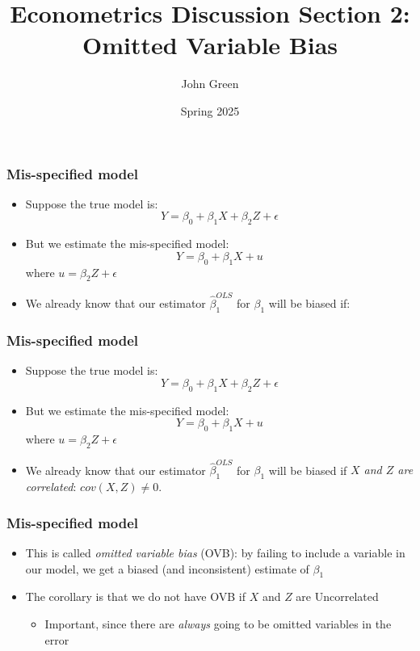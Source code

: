 \documentclass[aspectratio=169]{beamer}
\title{Econometrics Discussion Section 2: Omitted Variable Bias}
\author{John Green}
\date{Spring 2025}
\begin{document}
\begin{frame}
    \titlepage 
\end{frame}

\begin{frame}
    \frametitle{Mis-specified model}
    \begin{itemize}
        \item Suppose the true model is:
        $$
            Y = \beta_0 + \beta_1 X + \beta_2 Z + \epsilon
        $$
        \item But we estimate the mis-specified model:
        $$
            Y = \beta_0 + \beta_1 X + u
        $$
        where $u = \beta_2 Z + \epsilon$
        \item We already know that our estimator $\hat{\beta}_1^{OLS}$ for $\beta_1$ will be biased if:
    \end{itemize}
\end{frame}

\begin{frame}
    \frametitle{Mis-specified model}
    \begin{itemize}
        \item Suppose the true model is:
        $$
            Y = \beta_0 + \beta_1 X + \beta_2 Z + \epsilon
        $$
        \item But we estimate the mis-specified model:
        $$
            Y = \beta_0 + \beta_1 X + u
        $$
        where $u = \beta_2 Z + \epsilon$
        \item We already know that our estimator $\hat{\beta}_1^{OLS}$ for $\beta_1$ will be biased if \textit{$X$ and $Z$ are correlated}: $cov(X,Z) \neq 0 $.
    \end{itemize}
\end{frame}

\begin{frame}
    \frametitle{Mis-specified model}
    \begin{itemize}
        \item This is called \textit{omitted variable bias} (OVB): by failing to include a variable in our model, we get a biased (and inconsistent) estimate of $\beta_1$
        \item The corollary is that we do not have OVB if $X$ and $Z$ are Uncorrelated
        \begin{itemize}
            \item Important, since there are \textit{always} going to be omitted variables in the error
        \end{itemize}
    \end{itemize}
\end{frame}
\end{document}
